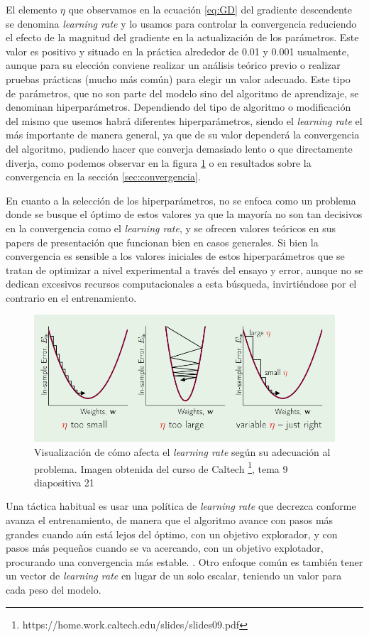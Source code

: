 El elemento $\eta$ que observamos en la ecuación \ref{eq:GD} del gradiente descendente se denomina \textit{learning rate} y lo usamos para controlar la convergencia reduciendo el efecto de la magnitud del gradiente en la actualización de los parámetros. Este valor es positivo y situado en la práctica alrededor de 0.01 y 0.001 usualmente, aunque para su elección conviene realizar un análisis teórico previo o realizar pruebas prácticas (mucho más común) para elegir un valor adecuado. Este tipo de parámetros, que no son parte del modelo sino del algoritmo de aprendizaje, se denominan hiperparámetros. Dependiendo del tipo de algoritmo o modificación del mismo que usemos habrá diferentes hiperparámetros, siendo el \textit{learning rate} el más importante de manera general, ya que de su valor dependerá la convergencia del algoritmo, pudiendo hacer que converja demasiado lento o que directamente diverja, como podemos observar en la figura \ref{fig:lr} o en resultados sobre la convergencia en la sección \ref{sec:convergencia}.

En cuanto a la selección de los hiperparámetros, no se enfoca como un problema donde se busque el óptimo de estos valores ya que la mayoría no son tan decisivos en la convergencia como el \textit{learning rate}, y se ofrecen valores teóricos en sus papers de presentación que funcionan bien en casos generales. Si bien la convergencia es sensible a los valores iniciales de estos hiperparámetros que se tratan de optimizar a nivel experimental a través del ensayo y error, aunque no se dedican excesivos recursos computacionales a esta búsqueda, invirtiéndose por el contrario en el entrenamiento.



\begin{figure}
    \centering
    \includegraphics[width=0.5\linewidth]{Plantilla_TFG_latex//imagenes//Mat//GD/lr.png}
    \caption{Visualización de cómo afecta el \textit{learning rate} según su adecuación al problema. Imagen obtenida del curso de Caltech \footnote{https://home.work.caltech.edu/slides/slides09.pdf}, tema 9 diapositiva 21}
    \label{fig:lr}
\end{figure}

Una táctica habitual es usar una política de \textit{learning rate} que decrezca conforme avanza el entrenamiento, de manera que el algoritmo avance con pasos más grandes cuando aún está lejos del óptimo, con un objetivo explorador, y con pasos más pequeños cuando se va acercando, con un objetivo explotador, procurando una convergencia más estable. \cite{GoodFellowBook}. Otro enfoque común es también tener un vector de \textit{learning rate} en lugar de un solo escalar, teniendo un valor para cada peso del modelo. 





